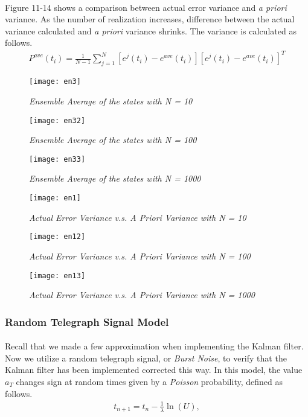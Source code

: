 \paragraph{}
Figure 11-14 shows a comparison between actual error variance and \textit{a priori} variance. As the number of realization increases, difference between the actual variance calculated and \textit{a priori} variance shrinks. The variance is calculated as follows.
\begin{align*}
P^{ave}(t_i)= \frac{1}{N-1}\sum_{j =1}^{N}[e^j(t_i)-e^{ave}(t_i)][e^j(t_i)-e^{ave}(t_i)]^T
\end{align*}
\begin{figure}[H]
	\centering
	\texttt{[image: en3]}
	\caption{\textit{Ensemble Average of the states with N = 10}}
\end{figure}
\begin{figure}[H]
	\centering
	\texttt{[image: en32]}
	\caption{\textit{Ensemble Average of the states with N = 100}}
\end{figure}
\begin{figure}[H]
	\centering
	\texttt{[image: en33]}
	\caption{\textit{Ensemble Average of the states with N = 1000}}
\end{figure}
\begin{figure}[H]
	\centering
	\texttt{[image: en1]}
	\caption{\textit{Actual Error Variance v.s. A Priori Variance with N = 10}}
\end{figure}
\begin{figure}[H]
	\centering
	\texttt{[image: en12]}
	\caption{\textit{Actual Error Variance v.s. A Priori Variance with N = 100}}
\end{figure}
\begin{figure}[H]
	\centering
	\texttt{[image: en13]}
	\caption{\textit{Actual Error Variance v.s. A Priori Variance with N = 1000}}
\end{figure}
\subsubsection{Random Telegraph Signal Model}
\paragraph{}
Recall that we made a few approximation when implementing the Kalman filter. Now we utilize a random telegraph signal, or \textit{Burst Noise}, to verify that the Kalman filter has been implemented corrected this way. In this model, the value $a_T$ changes sign at random times given by a \textit{Poisson} probability, defined as follows.
\begin{align*}
t_{n+1} = t_n - \frac{1}{\lambda}\ln(U),
\end{align*}
